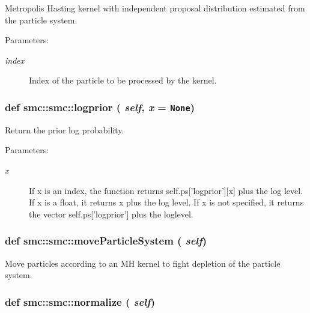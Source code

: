 Metropolis Hasting kernel with independent proposal distribution estimated from the particle system. 

\begin{Desc}
\item[Parameters:]
\begin{description}
\item[{\em index}]Index of the particle to be processed by the kernel. \end{description}
\end{Desc}
\hypertarget{classsmc_1_1smc_50453b83eb4dc3519a2be7cba5ae51c7}{
\subsubsection[{logprior}]{\setlength{\rightskip}{0pt plus 5cm}def smc::smc::logprior ( {\em self}, \/   {\em x} = {\tt None})}}
\label{classsmc_1_1smc_50453b83eb4dc3519a2be7cba5ae51c7}


Return the prior log probability. 

\begin{Desc}
\item[Parameters:]
\begin{description}
\item[{\em x}]If x is an index, the function returns self.ps\mbox{[}'logprior'\mbox{]}\mbox{[}x\mbox{]} plus the log level. If x is a float, it returns x plus the log level. If x is not specified, it returns the vector self.ps\mbox{[}'logprior'\mbox{]} plus the loglevel. \end{description}
\end{Desc}
\hypertarget{classsmc_1_1smc_cf375f96d980adede8438b3fead19938}{
\subsubsection[{moveParticleSystem}]{\setlength{\rightskip}{0pt plus 5cm}def smc::smc::moveParticleSystem ( {\em self})}}
\label{classsmc_1_1smc_cf375f96d980adede8438b3fead19938}


Move particles according to an MH kernel to fight depletion of the particle system. 

\hypertarget{classsmc_1_1smc_495a950f5dc0aa66fdf5279ae8ca6242}{
\subsubsection[{normalize}]{\setlength{\rightskip}{0pt plus 5cm}def smc::smc::normalize ( {\em self})}}
\label{classsmc_1_1smc_495a950f5dc0aa66fdf5279ae8ca6242}


